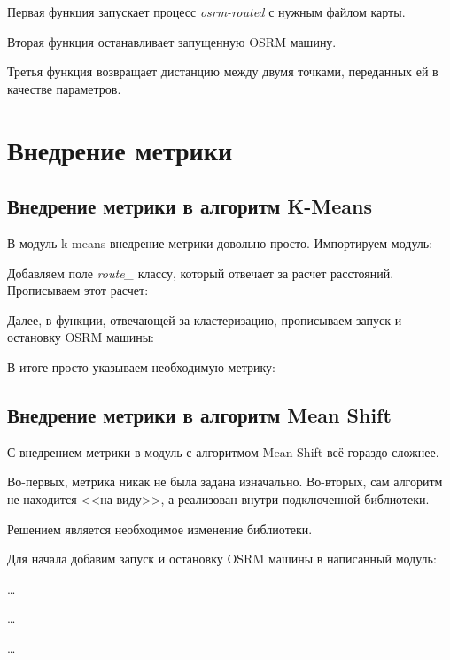 Первая функция запускает процесс \emph{osrm-routed} с нужным файлом карты.

Вторая функция останавливает запущенную OSRM машину.

Третья функция возвращает дистанцию между двумя точками, пе\-ре\-дан\-ных ей в качестве параметров.



\chapter{Внедрение метрики}
\section{Внедрение метрики в алгоритм K-Means}
В модуль k-means внедрение метрики довольно просто. Импортируем мо\-дуль:


Добавляем поле \emph{route\_} классу, который отвечает за расчет расстояний.
Прописываем этот расчет:


Далее, в функции, отвечающей за кластеризацию, прописываем запуск и остановку OSRM машины:



В итоге просто указываем необходимую метрику:


\section{Внедрение метрики в алгоритм Mean Shift}
С внедрением метрики в модуль с алгоритмом Mean Shift всё гораздо сложнее.

Во-первых, метрика никак не была задана изначально. Во-вторых, сам алгоритм не находится
<<на виду>>, а реализован внутри подключенной библиотеки.

Решением является необходимое изменение библиотеки.

Для начала добавим запуск и остановку OSRM машины в написанный модуль:

\ldots

\ldots

\ldots

